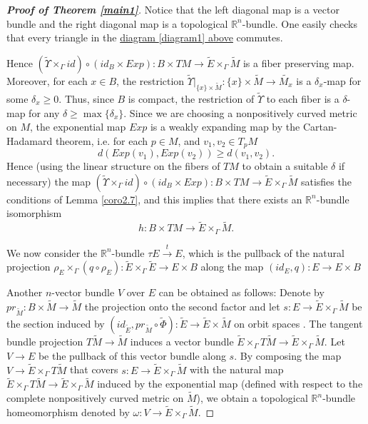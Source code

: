 \documentclass[onecolumn,notitlepage,11pt]{article}
\newcommand{\refer}[1]{\hyperref[#1]{\ref*{#1}}}%
\newcommand{\R}{\mathbb{R}}
\newcommand{\beq}{\begin{equation*}}
\newcommand{\eeq}{\end{equation*}}
\theoremstyle{definition}
\begin{document}
\begin{proof}[\textbf{Proof of Theorem \refer{main1}}]
Notice that the left diagonal map is a vector bundle and the right diagonal
map is a topological $\R^n$-bundle. 
One easily checks that every triangle in the  
\hyperref[diagram1]{diagram \ref*{diagram1} above} commutes. 

Hence
$(\widetilde{\Upsilon}\times_{\Gamma} id)\circ (id_B\times Exp):B\times TM\to \widetilde{E}\times_{\Gamma}
\widetilde{M}$ is a fiber preserving map. Moreover, for each $x\in B$,
the restriction 
$\widetilde{\Upsilon}|_{\{x\}\times\widetilde{M}}
:\{x\}\times\widetilde{M}\to\widetilde{M_x}$ 
is a $\delta_x$-map for some
$\delta_x\geq 0$. Thus, since $B$ is compact, 
the restriction of $\widetilde{\Upsilon}$ to each fiber
is a $\delta$-map for any 
$\delta\geq\max\{\delta_x\}$.
Since we are choosing a
nonpositively curved metric on $M$,
the exponential map $Exp$ is a weakly expanding map
by the Cartan-Hadamard theorem, i.e.
for each $p\in M$, and $v_1,v_2\in T_pM$
\beq
d(Exp(v_1),Exp(v_2))\geq d(v_1,v_2).
\eeq
Hence (using the linear structure on the fibers
of $TM$ to obtain a suitable $\delta$ if necessary)
the map 
$(\widetilde{\Upsilon}\times_{\Gamma} id)\circ (id_B\times Exp):
B\times TM\to\widetilde{E}\times_{\Gamma}
\widetilde{M}$
satisfies the conditions of Lemma \ref{coro2.7}, and this implies that
there exists an $\R^n$-bundle isomorphism
\beq
h:B\times TM\to\widetilde{E}\times_{\Gamma}\widetilde{M}.
\eeq

We now consider the $\R^n$-bundle $\tau E\xrightarrow{t}E$,
which is the pullback of the natural projection
$\rho_E\times_{\Gamma}(q\circ\rho_E):
\widetilde{E}\times_{\Gamma}\widetilde{E}\to
E	\times B$
along the map $(id_E,q):E\to E\times B$

Another $n$-vector bundle $V$	 over $E$ can be obtained as follows: Denote by 
$pr_{\widetilde{M}}:B\times\widetilde{M}\to\widetilde{M}$
the projection onto the second factor and let
$s:E\to\widetilde{E}\times_{\Gamma}\widetilde{M}$ be
the section induced by
$(id_{\widetilde{E}},pr_{\widetilde{M}}\circ\widetilde{\Phi})
:\widetilde{E}\to\widetilde{E}\times\widetilde{M}$ 
on orbit spaces . The tangent bundle
projection $T\widetilde{M}\to\widetilde{M}$ induces a 
vector bundle 
$\widetilde{E}\times_{\Gamma}T\widetilde{M}\to\widetilde{E}\times_{\Gamma}\widetilde{M}$.
Let $V\to E$ be the pullback of this vector bundle along 
$s$. By composing the
map $V\to\widetilde{E}\times_{\Gamma}T\widetilde{M}$
that covers $s:E\to\widetilde{E}\times_{\Gamma}\widetilde{M}$
with the natural map
$\widetilde{E}\times_{\Gamma}T\widetilde{M}\to\widetilde{E}\times_{\Gamma}\widetilde{M}$
induced by the exponential map (defined with respect to the complete
nonpositively curved metric on $\widetilde{M}$), we 
obtain a topological $\R^n$-bundle homeomorphism 
denoted by
$\omega:V\to\widetilde{E}\times_{\Gamma}\widetilde{M}$.


\end{proof}
\end{document}
